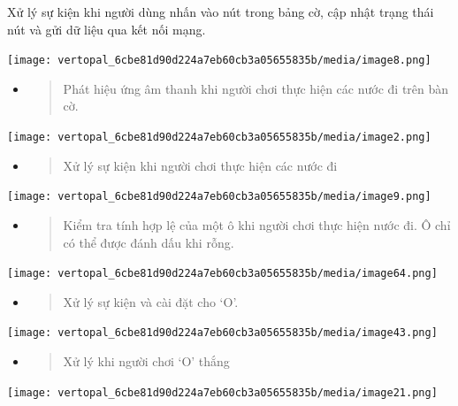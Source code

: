 \documentclass[a4paper]{article}
\begin{document}
Xử lý sự kiện khi người dùng nhấn vào nút trong bảng cờ, cập nhật trạng
thái nút và gửi dữ liệu qua kết nối mạng.

\texttt{[image: vertopal\_6cbe81d90d224a7eb60cb3a05655835b/media/image8.png]}

\begin{itemize}
\item
  \begin{quote}
  Phát hiệu ứng âm thanh khi người chơi thực hiện các nước đi trên bàn
  cờ.
  \end{quote}
\end{itemize}

\texttt{[image: vertopal\_6cbe81d90d224a7eb60cb3a05655835b/media/image2.png]}

\begin{itemize}
\item
  \begin{quote}
  Xử lý sự kiện khi người chơi thực hiện các nước đi
  \end{quote}
\end{itemize}

\texttt{[image: vertopal\_6cbe81d90d224a7eb60cb3a05655835b/media/image9.png]}

\begin{itemize}
\item
  \begin{quote}
  Kiểm tra tính hợp lệ của một ô khi người chơi thực hiện nước đi. Ô chỉ
  có thể được đánh dấu khi rỗng.
  \end{quote}
\end{itemize}

\texttt{[image: vertopal\_6cbe81d90d224a7eb60cb3a05655835b/media/image64.png]}

\begin{itemize}
\item
  \begin{quote}
  Xử lý sự kiện và cài đặt cho `O'.
  \end{quote}
\end{itemize}

\texttt{[image: vertopal\_6cbe81d90d224a7eb60cb3a05655835b/media/image43.png]}

\begin{itemize}
\item
  \begin{quote}
  Xử lý khi người chơi `O' thắng
  \end{quote}
\end{itemize}

\texttt{[image: vertopal\_6cbe81d90d224a7eb60cb3a05655835b/media/image21.png]}
\end{document}
